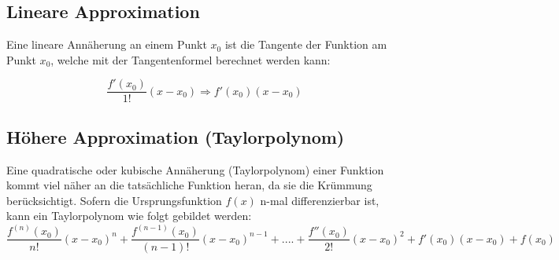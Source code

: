\documentclass[12pt]{scrartcl}
\begin{document}
\subsection{Lineare Approximation}

Eine lineare Annäherung an einem Punkt $x_0$ ist die Tangente der 
Funktion am Punkt $x_0$, welche mit der Tangentenformel berechnet werden kann:

\[ \frac{f'( x_0 )}{1!} ( x - x_0) \Rightarrow f'( x_0 ) ( x - x_0) \] 


\subsection{Höhere Approximation (Taylorpolynom)}

Eine quadratische oder kubische Annäherung (Taylorpolynom) einer Funktion kommt viel näher an die tatsächliche Funktion heran, 
da sie die Krümmung berücksichtigt. Sofern die Ursprungsfunktion $f(x)$ n-mal
differenzierbar ist, kann ein Taylorpolynom wie folgt gebildet werden:
\[
    \frac{f^{(n)} ( x_0 )}{n!} ( x - x_0)^n +
    \frac{f^{(n-1)} ( x_0 )}{(n - 1)!} ( x - x_0)^{n - 1} + .... +
    \frac{f'' ( x_0 )}{2!} ( x - x_0)^2 + 
    f' ( x_0 ) ( x - x_0) + f(x_0)
\]


\newcommand{\drawmisding}{
    \begin{tikzpicture}[line cap=round,line join=round,>=triangle 45,x=1cm,y=1cm]
        \clip(-2,-3) rectangle (2,3);
        \draw[line width=2pt,smooth,samples=200,domain=0.14:2.5] plot(\x,{ln((\x))});
        \begin{scriptsize}
            \draw[color=black] (0,-4) node {$f$};
        \end{scriptsize}
    \end{tikzpicture}
}
\end{document}
